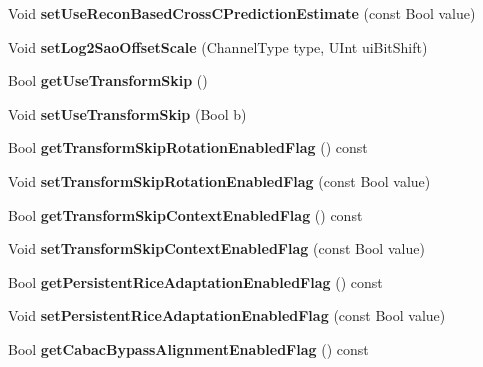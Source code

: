 \begin{DoxyCompactItemize}
Void {\bfseries set\+Use\+Recon\+Based\+Cross\+C\+Prediction\+Estimate} (const Bool value)
\item 
\mbox{\label{class_t_enc_cfg_a56c243ddfb1e27bf9f0f6882ef062390}} 
Void {\bfseries set\+Log2\+Sao\+Offset\+Scale} (Channel\+Type type, U\+Int ui\+Bit\+Shift)
\item 
\mbox{\label{class_t_enc_cfg_a6a2e568e434a2720df89332fe5b03da1}} 
Bool {\bfseries get\+Use\+Transform\+Skip} ()
\item 
\mbox{\label{class_t_enc_cfg_aaf1ef4b337376c5dca286d7d2d061a26}} 
Void {\bfseries set\+Use\+Transform\+Skip} (Bool b)
\item 
\mbox{\label{class_t_enc_cfg_a858ccee922a1b3c49951ffc140925095}} 
Bool {\bfseries get\+Transform\+Skip\+Rotation\+Enabled\+Flag} () const
\item 
\mbox{\label{class_t_enc_cfg_ad1482b21f4e5e3ac2a6ca5d23539fed1}} 
Void {\bfseries set\+Transform\+Skip\+Rotation\+Enabled\+Flag} (const Bool value)
\item 
\mbox{\label{class_t_enc_cfg_a4b936b72e14ac74518ad1f4c18443746}} 
Bool {\bfseries get\+Transform\+Skip\+Context\+Enabled\+Flag} () const
\item 
\mbox{\label{class_t_enc_cfg_acff4ad61e7cf5849b52da76b7db87e22}} 
Void {\bfseries set\+Transform\+Skip\+Context\+Enabled\+Flag} (const Bool value)
\item 
\mbox{\label{class_t_enc_cfg_ac5d9b521988bf2ffe2d29d66ca196bcc}} 
Bool {\bfseries get\+Persistent\+Rice\+Adaptation\+Enabled\+Flag} () const
\item 
\mbox{\label{class_t_enc_cfg_a2996e4e1f30919062ff0cf0cfabf956d}} 
Void {\bfseries set\+Persistent\+Rice\+Adaptation\+Enabled\+Flag} (const Bool value)
\item 
\mbox{\label{class_t_enc_cfg_a1bfba49031797a34f697c6d532dce89e}} 
Bool {\bfseries get\+Cabac\+Bypass\+Alignment\+Enabled\+Flag} () const
\item 

\end{DoxyCompactItemize}
